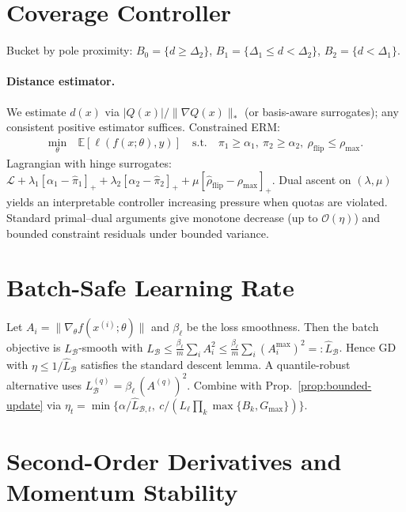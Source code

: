 \documentclass[twoside,11pt]{article}
\begin{document}
\section*{Coverage Controller}
\label{sec:coverage}
Bucket by pole proximity: $B_0=\{d\ge\Delta_2\}$, $B_1=\{\Delta_1\le d<\Delta_2\}$, $B_2=\{d<\Delta_1\}$.
\paragraph{Distance estimator.} We estimate $d(x)$ via $|Q(x)|/\|\nabla Q(x)\|_{*}$ (or basis-aware surrogates); any consistent positive estimator suffices. Constrained ERM:
\begin{align}
\min_{\theta}\ &\mathbb{E}[\ell(f(x;\theta),y)]\quad\text{s.t.}\quad \pi_1\ge\alpha_1,\ \pi_2\ge\alpha_2,\ \rho_{\mathrm{flip}}\le\rho_{\max}.
\end{align}
Lagrangian with hinge surrogates: $\mathcal{L}+\lambda_1[\alpha_1-\hat\pi_1]_++\lambda_2[\alpha_2-\hat\pi_2]_++\mu[\hat\rho_{\mathrm{flip}}-\rho_{\max}]_+$. Dual ascent on $(\lambda,\mu)$ yields an interpretable controller increasing pressure when quotas are violated. Standard primal--dual arguments give monotone decrease (up to $\mathcal{O}(\eta)$) and bounded constraint residuals under bounded variance.

\section*{Batch-Safe Learning Rate}
\label{sec:batch-safe}
Let $A_i=\|\nabla_\theta f(x^{(i)};\theta)\|$ and \(\beta_\ell\) be the loss smoothness. Then the batch objective is $L_\mathcal{B}$-smooth with
$L_\mathcal{B}\le \tfrac{\beta_\ell}{m}\sum_i A_i^2 \le \tfrac{\beta_\ell}{m}\sum_i (A_i^{\max})^2 =: \widehat L_\mathcal{B}$. Hence GD with $\eta\le 1/\widehat L_\mathcal{B}$ satisfies the standard descent lemma. A quantile-robust alternative uses $L_\mathcal{B}^{(q)}=\beta_\ell\,(A^{(q)})^2$. Combine with Prop.~\ref{prop:bounded-update} via $\eta_t=\min\{\alpha/\widehat L_{\mathcal{B},t},\ c/(L_\ell\prod_k \max\{B_k,G_{\max}\})\}$.

\section*{Second-Order Derivatives and Momentum Stability}
\label{sec:second-order-momentum}
\end{document}
